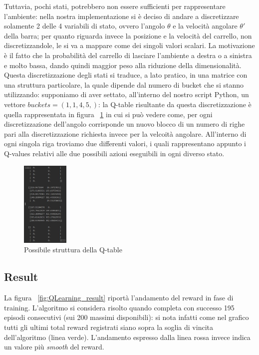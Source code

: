 Tuttavia, pochi stati, potrebbero non essere sufficienti per rappresentare l'ambiente: nella nostra implementazione si è deciso di andare a discretizzare solamente 2 delle 4 variabili di stato, ovvero l'angolo $\theta$ e la velocità angolare $\theta'$ della barra; per quanto riguarda invece la posizione e la velocità del carrello, non discretizzandole, le si va a mappare come dei singoli valori scalari. La motivazione è il fatto che la probabilità del carrello di lasciare l'ambiente a destra o a sinistra e molto bassa, dando quindi maggior peso alla riduzione della dimensionalità.
Questa discretizzazione degli stati si traduce, a lato pratico, in una matrice con una struttura particolare, la quale dipende dal numero di bucket che si stanno utilizzando: supponiamo di aver settato, all'interno del nostro script Python, un vettore $buckets=(1, 1, 4, 5,)$: la Q-table risultante da questa discretizzazione è quella rappresentata in figura ~\ref{fig:Q_table_example} in cui si può vedere come, per ogni discretizzazione dell'angolo corrisponde un nuovo blocco di un numero di righe pari alla discretizzazione richiesta invece per la velcoità angolare. All'interno di ogni singola riga troviamo due differenti valori, i quali rappresentano appunto i Q-values relativi alle due possibili azioni eseguibili in ogni diverso stato.

\begin{figure}[!h]
	\centering
	\includegraphics[width=0.2\textwidth]{Immagini/Example_of_Q_table.JPG}
	\caption{Possibile struttura della Q-table}
	\label{fig:Q_table_example}
\end{figure}

\subsection{Result}
La figura ~\ref{fig:QLearning_result} riportà l'andamento del reward in fase di training. L'algoritmo si considera risolto quando completa con successo 195 episodi consecutivi (sui 200 massimi disponibili): si nota infatti come nel grafico tutti gli ultimi total reward registrati siano sopra la soglia di vincita dell'algoritmo (linea verde).
L'andamento espresso dalla linea rossa invece indica un valore più \textit{smooth} del reward.

